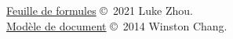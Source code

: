 \documentclass[10pt,landscape]{article}
\begin{document}
\begin{multicols}{3}
\hrulefill


\scriptsize

\href{https://github.com/zhouluke/PhysicsFormulas}{Feuille de formules}  \copyright\ 2021 Luke Zhou. \\
\href{http://wch.github.io/latexsheet/}{Modèle de document}  \copyright\ 2014 Winston Chang.


\end{multicols}
\end{document}
